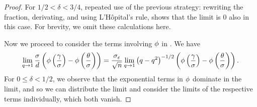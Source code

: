 \begin{proof}
  For \(1/2 < \delta < 3/4\), repeated use of the previous strategy: rewriting the fraction, derivating, and using L'Hôpital's rule, shows that the limit is 0 also in this case. For brevity, we omit these calculations here.

  Now we proceed to consider the terms involving \(\operatorname{\phi}\) in . We have
  \begin{equation}
    \label{eq:eval-qlimit-pdfterm}
    \lim_{q \rightarrow 1} \frac{\sigma}{d} \left(\operatorname{\phi} \left(\frac{\gamma}{\sigma}\right) - \operatorname{\phi} \left(\frac{\theta}{\sigma}\right)\right)
    = \frac{\sigma_\varepsilon}{\sqrt{n}} \lim_{q \rightarrow 1} \left(q - q^2\right)^{-1/2}\left( \operatorname{\phi}\left(\frac{\gamma}{\sigma}\right) - \operatorname{\phi}\left(\frac{\theta}{\sigma}\right)\right).
  \end{equation}
  For \(0 \leq \delta < 1/2\), we observe that the exponential terms in \(\operatorname{\phi}\) dominate in the limit, and so we can distribute the limit and consider the limits of the respective terms individually, which both vanish.


\end{proof}
